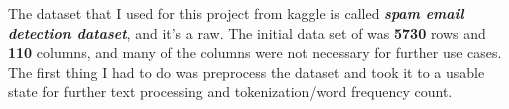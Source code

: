 The dataset that I used for this project from kaggle\cite{spam-email-detection-dataset}
is called \textbf{\textit{spam email detection dataset}}, and it’s a raw.
The initial data set of was \textbf{5730} rows and \textbf{110} columns,
and many of the columns were not necessary for further use cases.
The first thing I had to do was preprocess the dataset and took it to
a usable state for further text processing and tokenization/word frequency count.